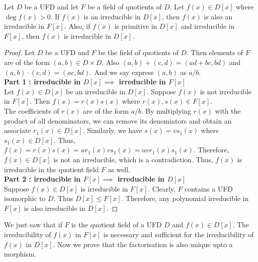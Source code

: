\begin{lemma}
	Let $D$ be a UFD and let $F$ be a field of quotients of $D$.
	Let $f(x) \in D[x]$ where $\deg f(x) > 0$.
	If $f(x)$ is an irreducible in $D[x]$, then $f(x)$ is also an irreducible in $F[x]$.
	Also, if $f(x)$ is primitive in $D[x]$ and irreducible in $F[x]$, then $f(x)$ is irreducible in $D[x]$.
\end{lemma}
\begin{proof}
	Let $D$ be a UFD and $F$ be the field of quotients of $D$.
	Then elements of $F$ are of the form $(a,b) \in D \times D$.
	Also $(a,b)+(c,d)  = (ad+bc,bd)$ and $(a,b)\cdot (c,d) = (ac,bd)$.
	And we say express $(a,b)$ as $a/b$.\\

	\textbf{Part 1 : irreducible in $D[x] \implies$ irreducible in $F[x]$}\\
	Let $f(x) \in D[x]$ be an irreducible in $D[x]$.
	Suppose $f(x)$ is not irreducible in $F[x]$.
	Then $f(x) = r(x)s(x)$ where $r(x),s(x) \in F[x]$.\\

	The coefficients of $r(x)$ are of the form $a/b$.
	By multiplying $r(x)$ with the product of all denominators, we can remove its denomiators and obtain an associate $r_1(x) \in D[x]$.
	Similarly, we have $s(x) = vs_1(x)$ where $s_1(x) \in D[x]$.
	Thus, $f(x) = r(x)s(x) = ur_1(x)vs_1(x) = uv r_1(x)s_1(x)$.
	Therefore, $f(x) \in D[x]$ is not an irreducible, which is a contradiction.
	Thus, $f(x)$ is irreducible in the quotient field $F$ as well.\\

	\textbf{Part 2 : irreducible in $F[x] \implies$ irreducible in $D[x]$}\\
	Suppose $f(x) \in D[x]$ is irreducible in $F[x]$.	
	Clearly, $F$ contains a UFD isomorphic to $D$.
	Thus $D[x] \le F[x]$.
	Therefore, any polynomial irreducible in $F[x]$ is also irreducible in $D[x]$.
\end{proof}
	We just saw that if $F$ is the quotient field of a UFD $D$ and $f(x) \in D[x]$. The irreducibility of $f(x)$ in $F[x]$ is necessary and sufficient for the irreducibility of $f(x)$ in $D[x]$. Now we prove that the factorisation is also unique upto a morphism.

